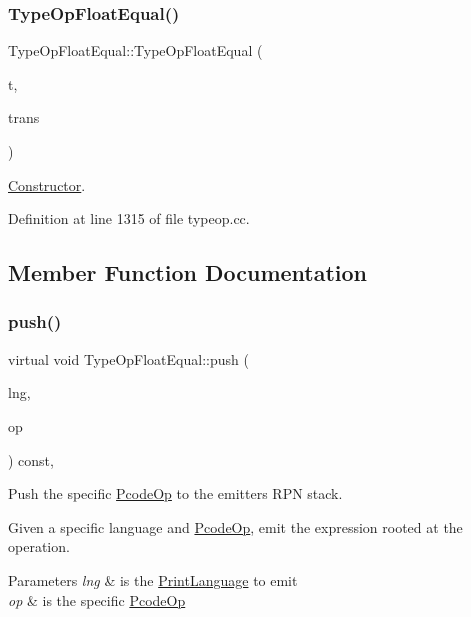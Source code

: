 \subsubsection{\texorpdfstring{TypeOpFloatEqual()}{TypeOpFloatEqual()}}
{\footnotesize\ttfamily Type\+Op\+Float\+Equal\+::\+Type\+Op\+Float\+Equal (\begin{DoxyParamCaption}\item[{\mbox{\hyperlink{class_type_factory}{Type\+Factory}} $\ast$}]{t,  }\item[{const \mbox{\hyperlink{class_translate}{Translate}} $\ast$}]{trans }\end{DoxyParamCaption})}



\mbox{\hyperlink{class_constructor}{Constructor}}. 



Definition at line 1315 of file typeop.\+cc.



\subsection{Member Function Documentation}
\mbox{\label{class_type_op_float_equal_a4252abd880968a0e035d0520cb1ae172}} 
\subsubsection{\texorpdfstring{push()}{push()}}
{\footnotesize\ttfamily virtual void Type\+Op\+Float\+Equal\+::push (\begin{DoxyParamCaption}\item[{\mbox{\hyperlink{class_print_language}{Print\+Language}} $\ast$}]{lng,  }\item[{const \mbox{\hyperlink{class_pcode_op}{Pcode\+Op}} $\ast$}]{op }\end{DoxyParamCaption}) const\hspace{0.3cm}{\ttfamily [inline]}, {\ttfamily [virtual]}}



Push the specific \mbox{\hyperlink{class_pcode_op}{Pcode\+Op}} to the emitter\textquotesingle{}s R\+PN stack. 

Given a specific language and \mbox{\hyperlink{class_pcode_op}{Pcode\+Op}}, emit the expression rooted at the operation. 
\begin{DoxyParams}{Parameters}
{\em lng} & is the \mbox{\hyperlink{class_print_language}{Print\+Language}} to emit \\
\hline
{\em op} & is the specific \mbox{\hyperlink{class_pcode_op}{Pcode\+Op}} \\
\hline
\end{DoxyParams}



